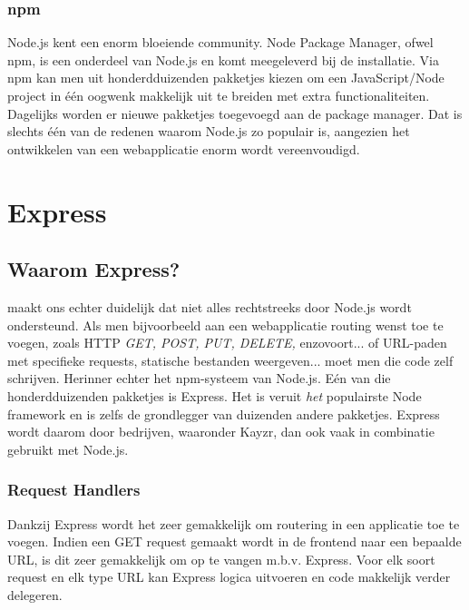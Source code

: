 \subsubsection{npm}
\label{sec:npm}

Node.js kent een enorm bloeiende community. Node Package Manager, ofwel npm, is een onderdeel van Node.js en komt meegeleverd bij de installatie. Via npm kan men uit honderdduizenden pakketjes kiezen om een JavaScript/Node project in één oogwenk makkelijk uit te breiden met extra functionaliteiten. Dagelijks worden er nieuwe pakketjes toegevoegd aan de package manager. Dat is slechts één van de redenen waarom Node.js zo populair is, aangezien het ontwikkelen van een webapplicatie enorm wordt vereenvoudigd.   

\section{Express}
\label{sec:express}

\subsection{Waarom Express?}
\label{sec:whyExpress}

\textcite{ExpressMozilla} maakt ons echter duidelijk dat niet alles rechtstreeks door Node.js wordt ondersteund. Als men bijvoorbeeld aan een webapplicatie routing wenst toe te voegen, zoals HTTP \textsl{GET, POST, PUT, DELETE,} enzovoort... of URL-paden met specifieke requests, statische bestanden weergeven... moet men die code zelf schrijven. Herinner echter het npm-systeem van Node.js. Eén van die honderdduizenden pakketjes is Express. Het is veruit \textit{het} populairste Node framework en is zelfs de grondlegger van duizenden andere pakketjes. Express wordt daarom door bedrijven, waaronder Kayzr, dan ook vaak in combinatie gebruikt met Node.js.

\subsubsection{Request Handlers}
\label{sec:reqHandlers}

Dankzij Express wordt het zeer gemakkelijk om routering in een applicatie toe te voegen. Indien een GET request gemaakt wordt in de frontend naar een bepaalde URL, is dit zeer gemakkelijk om op te vangen m.b.v. Express. Voor elk soort request en elk type URL kan Express logica uitvoeren en code makkelijk verder delegeren.

